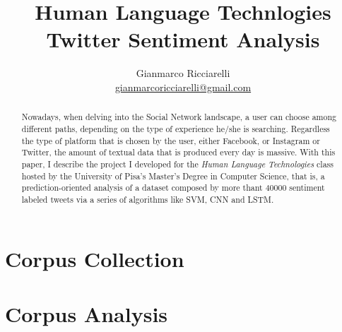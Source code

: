 \documentclass[11pt]{article}
\title{\textbf{Human Language Technlogies \\ Twitter Sentiment Analysis}}
\author{Gianmarco Ricciarelli \\ \href{mailto:gianmarcoricciarelli@gmail.com}{gianmarcoricciarelli@gmail.com}}
\date{}
\begin{document}
    \maketitle

    \begin{abstract}
        \noindent
        Nowadays, when delving into the Social Network landscape, a user can choose among different
        paths, depending on the type of experience he/she is searching. Regardless the type of platform that is
        chosen by the user, either Facebook, or Instagram or Twitter, the amount of textual data that is
        produced every day is massive. With this paper, I describe the project I developed for the
        \textit{Human Language Technologies} class hosted by the University of Pisa's Master's Degree in
        Computer Science, that is, a prediction-oriented analysis of a dataset composed by more thant $40000$
        sentiment labeled tweets via a series of algorithms like SVM, CNN and LSTM.
    \end{abstract}

    \begin{multicols}{2}
        \section{Corpus Collection} %
        \label{sec:corpus_collection}
            \lipsum[1]
            \lipsum[1]
            \lipsum[1]

        \section{Corpus Analysis} %
        \label{sec:corpus_analysis}

    \end{multicols}
\end{document}
